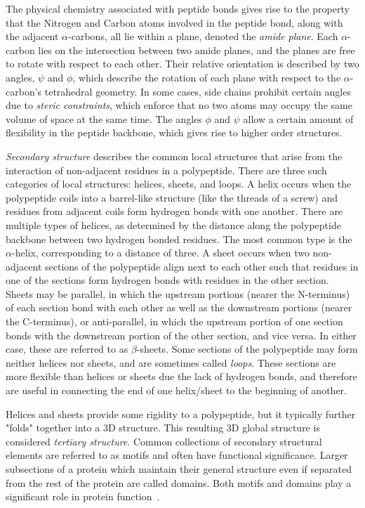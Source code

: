 The physical chemistry associated with peptide bonds gives rise to the property that the Nitrogen and Carbon atoms involved in the peptide bond, along with the adjacent $\alpha$-carbons, all lie within a plane, denoted the \textit{amide plane}.
Each $\alpha$-carbon lies on the intersection between two amide planes, and the planes are free to rotate with respect to each other. 
Their relative orientation is described by two angles, $\psi$ and $\phi$, which describe the rotation of each plane with respect to the $\alpha$-carbon's tetrahedral geometry.
In some cases, side chains prohibit certain angles due to \textit{steric constraints}, which enforce that no two atoms may occupy the same volume of space at the same time.
The angles $\phi$ and $\psi$ allow a certain amount of flexibility in the peptide backbone, which gives rise to higher order structures.

\textit{Secondary structure} describes the common local structures that arise from the interaction of non-adjacent residues in a polypeptide.
There are three such categories of local structures: helices, sheets, and loops.
A helix occurs when the polypeptide coils into a barrel-like structure (like the threads of a screw) and residues from adjacent coils form hydrogen bonds with one another.
There are multiple types of helices, as determined by the distance along the polypeptide backbone between two hydrogen bonded residues.
The most common type is the $\alpha$-helix, corresponding to a distance of three. 
A sheet occurs when two non-adjacent sections of the polypeptide align next to each other such that residues in one of the sections form hydrogen bonds with residues in the other section.
Sheets may be parallel, in which the upstream portions (nearer the N-terminus) of each section bond with each other as well as the downstream portions (nearer the C-terminus), or anti-parallel, in which the upstream portion of one section bonds with the downstream portion of the other section, and vice versa.
In either case, these are referred to as $\beta$-sheets. 
Some sections of the polypeptide may form neither helices nor sheets, and are sometimes called \textit{loops}.
These sections are more flexible than helices or sheets due the lack of hydrogen bonds, and therefore are useful in connecting the end of one helix/sheet to the beginning of another.

Helices and sheets provide some rigidity to a polypeptide, but it typically further "folds" together into a 3D structure.
This resulting 3D global structure is considered \textit{tertiary structure}.
Common collections of secondary structural elements are referred to as motifs and often have functional significance.
Larger subsections of a protein which maintain their general structure even if separated from the rest of the protein are called domains. 
Both motifs and domains play a significant role in protein function~\cite{scheeffink2003}.

